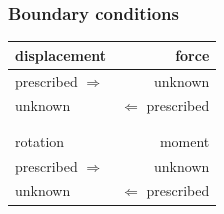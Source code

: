 \begin{frame}
  \frametitle{Boundary conditions}
  \vspace{4em}
  \begin{center}
    \begin{tabular}{lr}
      displacement & force \\
      \hline
      prescribed $\Rightarrow$ & unknown \\
      unknown & $\Leftarrow$ prescribed \\
      \hline \\
      \\
      rotation & moment \\
      \hline
      prescribed $\Rightarrow$ & unknown \\
      unknown & $\Leftarrow$ prescribed \\
      \hline
    \end{tabular}
  \end{center}
  
\end{frame}


